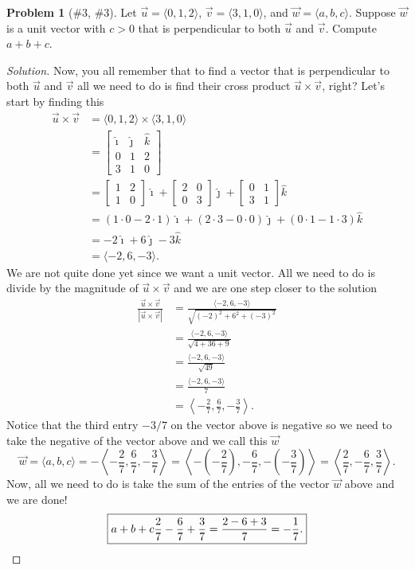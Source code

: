 \documentclass{article}
\theoremstyle{plain}
\theoremstyle{definition}
\newtheorem{problem}[exercise]{Problem}
\theoremstyle{remark}
\begin{document}
\begin{problem}[{\color{Green}\#3}, {\color{Red}\#3}]
Let $\vec u=\langle 0,1,2\rangle$, $\vec v=\langle 3,1,0\rangle$, and $\vec
w=\langle a,b,c\rangle$. Suppose $\vec w$ is a unit vector with $c>0$ that
is perpendicular to both $\vec u$ and $\vec v$. Compute $a+b+c$.
\end{problem}
\begin{proof}[Solution]
Now, you all remember that to find a vector that is perpendicular to both
$\vec u$ and $\vec v$ all we need to do is find their cross product $\vec
u\times \vec v$, right? Let's start by finding this
\begingroup
\allowdisplaybreaks
\begin{align*}
\vec u\times\vec v
&=\langle 0,1,2\rangle\times\langle 3,1,0\rangle\\
&=\begin{bmatrix}
\hat\imath&\hat\jmath&\hat k\\
0&1&2\\
3&1&0
\end{bmatrix}\\
&=\begin{bmatrix}
1&2\\1&0
\end{bmatrix}\hat\imath
+\begin{bmatrix}
2&0\\
0&3
\end{bmatrix}\hat\jmath
+\begin{bmatrix}
0&1\\
3&1
\end{bmatrix}\hat k\\
&=(1\cdot 0-2\cdot 1)\hat\imath+(2\cdot 3-0\cdot 0)\hat\jmath+(0\cdot
  1-1\cdot 3)\hat k\\
&=-2\hat\imath+6\hat\jmath-3\hat k\\
&=\langle -2,6,-3\rangle.
\end{align*}
\endgroup
We are not quite done yet since we want a unit vector. All we need to do is
divide by the magnitude of $\vec u\times\vec v$ and we are one step closer
to the solution
\begingroup
\allowdisplaybreaks
\begin{align*}
\frac{\vec u\times\vec v}{\left|\vec u\times\vec v\right|}
&=\frac{\langle -2,6,-3\rangle}{\sqrt{(-2)^2+6^2+(-3)^2}}\\
&=\frac{\langle -2,6,-3\rangle}{\sqrt{4+36+9}}\\
&=\frac{\langle -2,6,-3\rangle}{\sqrt{49}}\\
&=\frac{\langle -2,6,-3\rangle}{7}\\
&=\left<-\frac{2}{7},\frac{6}{7},-\frac{3}{7}\right>.
\end{align*}
\endgroup
Notice that the third entry $-3/7$ on the vector above is negative so we
need to take the negative of the vector above and we call this $\vec w$
\[
\vec w
=\langle a,b,c\rangle=-\left<-\frac{2}{7},\frac{6}{7},-\frac{3}{7}\right>
=\left<-\left(-\frac{2}{7}\right),-\frac{6}{7},-\left(-\frac{3}{7}\right)\right>
=\left<\frac{2}{7},-\frac{6}{7},\frac{3}{7}\right>.
\]
Now, all we need to do is take the sum of the entries of the vector
$\vec w$ above and we are done!
\[
\boxed{a+b+c\frac{2}{7}-\frac{6}{7}+\frac{3}{7}=
\frac{2-6+3}{7}=
-\frac{1}{7}.}\qedhere
\]
\end{proof}
\end{document}
